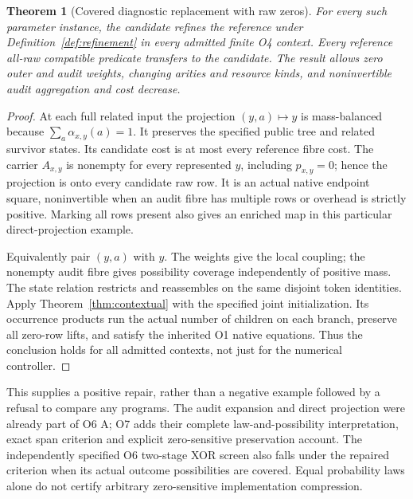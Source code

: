 \documentclass[11pt,a4paper]{article}
\newtheorem{theorem}{Theorem}[section]
\theoremstyle{definition}
\begin{document}
\begin{theorem}[Covered diagnostic replacement with raw zeros]
\label{thm:application}
For every such parameter instance, the candidate refines the reference
under Definition~\ref{def:refinement} in every admitted finite O4 context.
Every reference all-raw compatible predicate transfers to the candidate.
The result allows zero outer and audit weights, changing arities and
resource kinds, and noninvertible audit aggregation and cost decrease.
\end{theorem}
\begin{proof}
At each full related input the projection $(y,a)\mapsto y$ is
mass-balanced because $\sum_a\alpha_{x,y}(a)=1$. It preserves the
specified public tree and related survivor states. Its candidate cost
is at most every reference fibre cost. The carrier $A_{x,y}$ is nonempty
for every represented $y$, including $p_{x,y}=0$; hence the projection
is onto every candidate raw row. It is an actual native endpoint square,
noninvertible when an audit fibre has multiple rows or overhead is
strictly positive. Marking all rows present also gives an enriched map
in this particular direct-projection example.

Equivalently pair $(y,a)$ with $y$. The weights give the local coupling;
the nonempty audit fibre gives possibility coverage independently of
positive mass. The state relation restricts and reassembles on the same
disjoint token identities. Apply Theorem~\ref{thm:contextual} with the
specified joint initialization. Its occurrence products run the actual
number of children on each branch, preserve all zero-row lifts, and
satisfy the inherited O1 native equations. Thus the conclusion holds for
all admitted contexts, not just for the numerical controller.
\end{proof}
This supplies a positive repair, rather than a negative example followed
by a refusal to compare any programs. The audit expansion and direct
projection were already part of O6 A; O7 adds their complete
law-and-possibility interpretation, exact span criterion and explicit
zero-sensitive preservation account. The independently specified O6
two-stage XOR screen also falls under the repaired criterion when its
actual outcome possibilities are covered. Equal probability laws alone
do not certify arbitrary zero-sensitive implementation compression.
\end{document}

